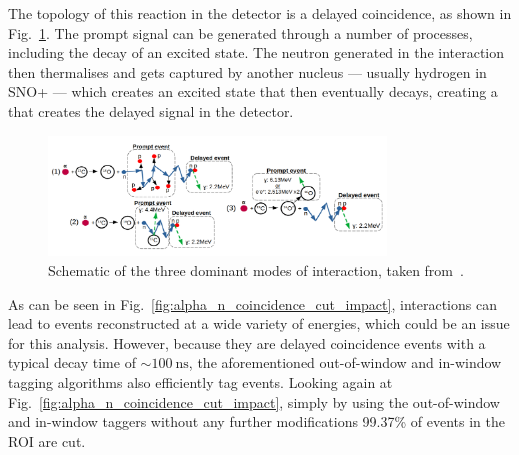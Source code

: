 The topology of this reaction in the detector is a delayed coincidence, as shown in Fig.~\ref{fig:alpha_n_drawing}. %
The prompt signal can be generated through a number of processes, including the decay of an excited  state. The neutron generated in the interaction then thermalises and gets captured by another nucleus --- usually hydrogen in SNO+ --- which creates an excited state that then eventually decays, creating a \ce{\gamma} that creates the delayed signal in the detector.

\begin{figure}
    \centering
    \includegraphics[width=0.8\textwidth]{6_SolarAnalysis/images/alpha_n_schematic_Iwan_modified.pdf}
    \caption[Schematic of \alphan{} interactions.]{Schematic of the three dominant modes of \alphan{} interaction, taken from~\cite{morton-blakeFirstMeasurementReactor2021}. %
    }
    \label{fig:alpha_n_drawing}
\end{figure}

As can be seen in Fig.~\ref{fig:alpha_n_coincidence_cut_impact}, \alphan{} interactions can lead to events reconstructed at a wide variety of energies, which could be an issue for this analysis. However, because they are delayed coincidence events with a typical decay time of $\sim\SI{100}{\nano\second}$, the aforementioned out-of-window and in-window  tagging algorithms also efficiently tag \alphan{} events. Looking again at Fig.~\ref{fig:alpha_n_coincidence_cut_impact}, simply by using the out-of-window and in-window  taggers without any further modifications 99.37\% of events in the ROI are cut.

